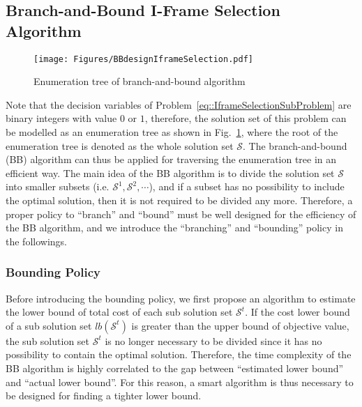\subsection{Branch-and-Bound I-Frame Selection Algorithm}
\label{sec::proposedBBAlg}
\begin{figure}
\begin{center}
\texttt{[image: Figures/BBdesignIframeSelection.pdf]}
\caption{\label{fig::BBdesgin}Enumeration tree of branch-and-bound algorithm}
\end{center}
\end{figure}
Note that the decision variables of Problem~\eqref{eq::IframeSelectionSubProblem} are binary integers with value $0$ or $1$, therefore, the  solution set of this problem can be modelled as an enumeration tree as shown in Fig.~\ref{fig::BBdesgin}, where the root of the enumeration tree is denoted as the whole solution set $\mathcal{S}$.
The branch-and-bound (BB) algorithm can thus be applied for traversing the enumeration tree in an efficient way.
The main idea of the BB algorithm is to divide the solution set $\mathcal{S}$ into smaller subsets (i.e. $\mathcal{S}^1, \mathcal{S}^2, \cdots$), and if a subset has no possibility to include the optimal solution, then it is not required to be divided any more.
Therefore, a proper policy to ``branch'' and ``bound'' must be well designed for the efficiency of the BB algorithm, and we introduce the ``branching'' and ``bounding'' policy in the followings.
%
\subsubsection{Bounding Policy}
\label{sec::proposedBBBoundingPolicy}
Before introducing the bounding policy, we first propose an algorithm to estimate the lower bound of total cost of each sub solution set $\mathcal{S}^t$.
If the cost lower bound of a sub solution set $lb(\mathcal{S}^t)$ is greater than the upper bound of objective value, the sub solution set $\mathcal{S}^t$ is no longer necessary to be divided since it has no possibility to contain the optimal solution.
Therefore, the time complexity of the BB algorithm is highly correlated to the gap between ``estimated lower bound'' and ``actual lower bound''.
For this reason, a smart algorithm is thus necessary to be designed for finding a tighter lower bound.

